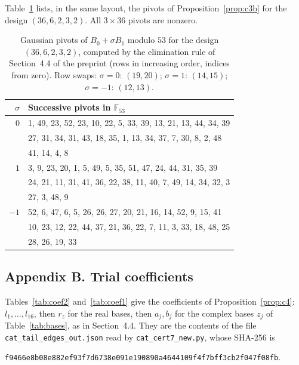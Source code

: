 \documentclass[11pt]{article}
\theoremstyle{definition}
\begin{document}
Table~\ref{tab:pivots53} lists, in the same layout, the pivots of Proposition~\ref{prop:c3b} for the design $(36,6,2,3,2)$. All $3\times36$ pivots are nonzero.

\begin{table}[ht]
\centering
\small
\begin{tabular}{rl}
\hline
$\sigma$ & Successive pivots in $\mathbb{F}_{53}$ \\
\hline
$0$ & 1, 49, 23, 52, 23, 10, 22, 5, 33, 39, 13, 21, 13, 44, 34, 39 \\
 & 27, 31, 34, 31, 43, 18, 35, 1, 13, 34, 37, 7, 30, 8, 2, 48 \\
 & 41, 14, 4, 8 \\
\hline
$1$ & 3, 9, 23, 20, 1, 5, 49, 5, 35, 51, 47, 24, 44, 31, 35, 39 \\
 & 24, 21, 11, 31, 41, 36, 22, 38, 11, 40, 7, 49, 14, 34, 32, 3 \\
 & 27, 3, 48, 9 \\
\hline
$-1$ & 52, 6, 47, 6, 5, 26, 26, 27, 20, 21, 16, 14, 52, 9, 15, 41 \\
 & 10, 23, 12, 22, 44, 37, 21, 36, 22, 7, 11, 3, 33, 18, 48, 25 \\
 & 28, 26, 19, 33 \\
\hline
\end{tabular}
\caption{Gaussian pivots of $B_0+\sigma B_1$ modulo $53$ for the design $(36,6,2,3,2)$, computed by the elimination rule of Section~4.4 of the preprint (rows in increasing order, indices from zero). Row swaps: $\sigma=0$: $(19,20)$; $\sigma=1$: $(14,15)$; $\sigma=-1$: $(12,13)$.}
\label{tab:pivots53}
\end{table}

\clearpage
\subsection*{Appendix B. Trial coefficients}

Tables~\ref{tab:coef2} and~\ref{tab:coef1} give the coefficients of Proposition~\ref{prop:c4}: $l_1,\dots,l_{16}$, then $r_z$ for the real bases, then $a_j,b_j$ for the complex bases $z_j$ of Table~\ref{tab:bases}, as in Section~4.4. They are the contents of the file \texttt{cat\_tail\_edges\_out.json} read by \texttt{cat\_cert7\_new.py}, whose SHA-256 is
\begin{center}\texttt{f9466e8b08e882ef93f7d6738e091e190890a4644109f4f7bff3cb2f047f08fb}.\end{center}
\end{document}

